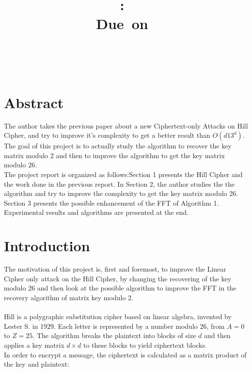 \documentclass{article}
\title{
\logoepfl
\vspace{2in}
\textmd{\textbf{\hmwkClass:\ \hmwkTitle}}\\
\normalsize\vspace{0.1in}\small{Due\ on\ \hmwkDueDate}\\
\author{\textbf{\hmwkAuthorName}}
\vspace{0.1in}\large{\textit{\hmwkClassInstructor\ \hmwkClassTime}}
\vspace{3in}
\logolasec
}
\begin{document}
\maketitle

\newpage
\section*{Abstract}
The author takes the previous paper about a new Ciphertext-only Attacks on Hill Cipher, and try to improve it's complexity to get a better result than $O(d13^d)$.\\
${}$\hspace{1em}The goal of this project is to actually study the algorithm to recover the key matrix modulo 2 and then to improve the algorithm to get the key matrix modulo 26.\\
${}$\hspace{1em}The project report is organized as follows:Section 1 presents the Hill Cipher and the work done in the previous report. In Section 2, the author studies the the algorithm and try to improve the complexity to get the key matrix modulo 26. Section 3 presents the possible enhancement of the FFT of Algorithm 1. Experimental results and algorithms are presented at the end.

\newpage
\tableofcontents
\newpage



\section{Introduction}
The motivation of this project is, first and foremost, to improve the Linear Cipher only attack on the Hill Cipher, by changing the recovering of the key modulo 26 and then look at the possible algorithm to improve the FFT in the recovery algorithm of matrix key modulo 2.\\
\\
Hill is a polygraphic substitution cipher based on linear algebra, invented by Lester S. in 1929. Each letter is represented by a number modulo 26, from $A=0$ to $Z=25$. The algorithm breaks the plaintext into blocks of size $d$ and then applies a key matrix $d \times d $ to these blocks to yield ciphertext blocks.\\
In order to encrypt a message, the ciphertext is calculated as a matrix product of the key and plaintext:
\end{document}
